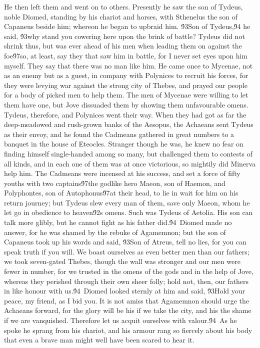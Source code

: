 {He then left them and went on to others. Presently he saw the son of Tydeus, noble Diomed, standing by his chariot and horses, with Sthenelus the son of Capaneus beside him; whereon he began to upbraid him. \'93Son of Tydeus,\'94 he said, \'93why stand you cowering here upon the brink of battle? Tydeus did not shrink thus, but was ever ahead of his men when leading them on against the foe\'97so, at least, say they that saw him in battle, for I never set eyes upon him myself. They say that there was no man like him. He came once to Mycenae, not as an enemy but as a guest, in company with Polynices to recruit his forces, for they were levying war against the strong city of Thebes, and prayed our people for a body of picked men to help them. The men of Mycenae were willing to let them have one, but Jove dissuaded them by showing them unfavourable omens. Tydeus, therefore, and Polynices went their way. When they had got as far the deep-meadowed and rush-grown banks of the Aesopus, the Achaeans sent Tydeus as their envoy, and he found the Cadmeans gathered in great numbers to a banquet in the house of Eteocles. Stranger though he was, he knew no fear on finding himself single-handed among so many, but challenged them to contests of all kinds, and in each one of them was at once victorious, so mightily did Minerva help him. The Cadmeans were incensed at his success, and set a force of fifty youths with two captains\'97the godlike hero Maeon, son of Haemon, and Polyphontes, son of Autophonus\'97at their head, to lie in wait for him on his return journey; but Tydeus slew every man of them, save only Maeon, whom he let go in obedience to heaven\'92s omens. Such was Tydeus of Aetolia. His son can talk more glibly, but he cannot fight as his father did.\'94\
Diomed made no answer, for he was shamed by the rebuke of Agamemnon; but the son of Capaneus took up his words and said, \'93Son of Atreus, tell no lies, for you can speak truth if you will. We boast ourselves as even better men than our fathers; we took seven-gated Thebes, though the wall was stronger and our men were fewer in number, for we trusted in the omens of the gods and in the help of Jove, whereas they perished through their own sheer folly; hold not, then, our fathers in like honour with us.\'94\
Diomed looked sternly at him and said, \'93Hold your peace, my friend, as I bid you. It is not amiss that Agamemnon should urge the Achaeans forward, for the glory will be his if we take the city, and his the shame if we are vanquished. Therefore let us acquit ourselves with valour.\'94\
As he spoke he sprang from his chariot, and his armour rang so fiercely about his body that even a brave man might well have been scared to hear it.\
}
